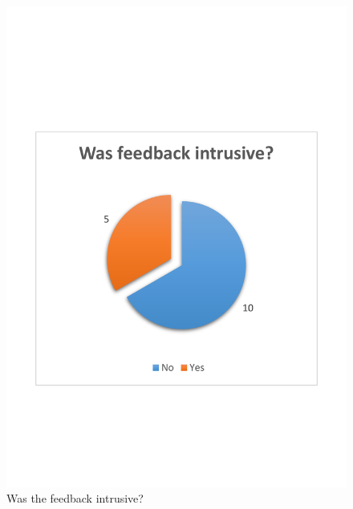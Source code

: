 \begin{figure}
\begin{minipage}{0.45\textwidth}
		\includegraphics[width=\textwidth]{charts/intrusivefeedback.pdf}
		\caption{Was the feedback intrusive?}
		\label{fig:chart-intrusivefeedback}
	\end{minipage}
\end{figure}

